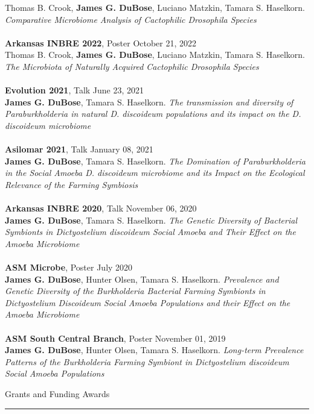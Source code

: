 \documentclass{article}
\begin{document}
Thomas B. Crook, \textbf{James G. DuBose}, Luciano Matzkin, Tamara S. Haselkorn. \emph{Comparative Microbiome Analysis of Cactophilic Drosophila Species}\\
\\
\textbf{Arkansas INBRE 2022}, Poster \hfill October 21, 2022\\
Thomas B. Crook, \textbf{James G. DuBose}, Luciano Matzkin, Tamara S. Haselkorn. \emph{The Microbiota of Naturally Acquired Cactophilic Drosophila Species}\\
\\
\textbf{Evolution 2021}, Talk \hfill June 23, 2021\\
\textbf{James G. DuBose}, Tamara S. Haselkorn. \emph{The transmission and diversity of Paraburkholderia in natural D. discoideum populations and its impact on the D. discoideum microbiome}\\
\\
\textbf{Asilomar 2021}, Talk \hfill January 08, 2021\\
\textbf{James G. DuBose}, Tamara S. Haselkorn. \emph{The Domination of Paraburkholderia in the Social Amoeba D. discoideum microbiome and its Impact on the Ecological Relevance of the Farming Symbiosis}\\
\\
\textbf{Arkansas INBRE 2020}, Talk \hfill November 06, 2020\\
\textbf{James G. DuBose}, Tamara S. Haselkorn. \emph{The Genetic Diversity of Bacterial Symbionts in Dictyostelium discoideum Social Amoeba and Their Effect on the Amoeba Microbiome}\\
\\
\textbf{ASM Microbe}, Poster \hfill July 2020\\
\textbf{James G. DuBose}, Hunter Olsen, Tamara S. Haselkorn. \emph{Prevalence and Genetic Diversity
of the Burkholderia Bacterial Farming Symbionts in Dictyostelium Discoideum Social Amoeba Populations and their Effect on the Amoeba Microbiome}\\
\\
\textbf{ASM South Central Branch}, Poster \hfill November 01, 2019\\
\textbf{James G. DuBose}, Hunter Olsen, Tamara S. Haselkorn. \emph{Long-term Prevalence Patterns of the Burkholderia Farming Symbiont in Dictyostelium discoideum Social Amoeba Populations}
\\
\begin{flushleft}
{\Large Grants and Funding Awards} \rule{16.51cm}{0.4pt}\\
\end{flushleft}
\end{document}
